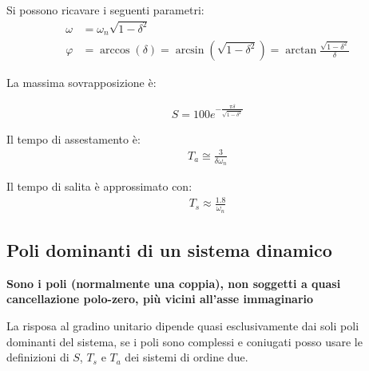 Si possono ricavare i seguenti parametri:
\begin{align}
  \omega &= \omega_n \sqrt{1-\delta^2} \\
  \varphi &= \arccos (\delta) = \arcsin (\sqrt{1 - \delta^2}) = \arctan \frac{\sqrt{1-\delta^2}}{\delta}
\end{align}



La massima sovrapposizione è:

\begin{align}
  S = 100 e^{-\frac{\pi \delta}{\sqrt{1-\delta^2}}}
\end{align}

Il tempo di assestamento è:
\begin{align}
  T_a \cong \frac{3}{\delta \omega_n}
\end{align}


Il tempo di salita è approssimato con:
\begin{align}
  T_s \approx \frac{1.8}{\omega_n}
\end{align}


\subsection{Poli dominanti di un sistema dinamico}






\textbf{Sono i poli (normalmente una coppia), non soggetti a quasi cancellazione polo-zero, più vicini all'asse immaginario}

La risposa al gradino unitario dipende quasi esclusivamente dai soli poli dominanti del
sistema, se i poli sono complessi e coniugati posso usare le definizioni di $S$, $T_s$ e $T_a$ 
dei sistemi di ordine due.




